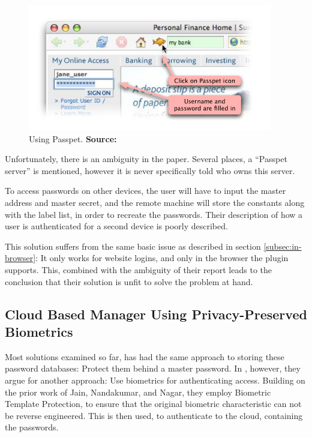 			\begin{figure}[htbp]
				\centering
				\includegraphics[width=0.95\textwidth]{figures/analysis/passpet.png}
				\caption{Using Passpet. \textbf{Source:} \cite[p.1]{passpet}}
				\label{fig:passpet_main}
			\end{figure}

			Unfortunately, there is an ambiguity in the paper. Several places, a ``Passpet server'' is mentioned, however it is never specifically told who owns this server. 

			To access passwords on other devices, the user will have to input the master address and master secret, and the remote machine will store the constants along with the label list, in order to recreate the passwords. Their description of how a user is authenticated for a second device is poorly described.

			This solution suffers from the same basic issue as described in section \ref{subsec:in-browser}: It only works for website logins, and only in the browser the plugin supports. This, combined with the ambiguity of their report leads to the conclusion that their solution is unfit to solve the problem at hand.


		\subsection*{Cloud Based Manager Using Privacy-Preserved Biometrics}
			Most solutions examined so far, has had the same approach to storing these password databases: Protect them behind a master password. In \cite{busch2014}, however, they argue for another approach: Use biometrics for authenticating access. Building on the prior work of Jain, Nandakumar, and Nagar, they employ Biometric Template Protection, to ensure that the original biometric characteristic can not be reverse engineered. This is then used, to authenticate to the cloud, containing the passwords.


